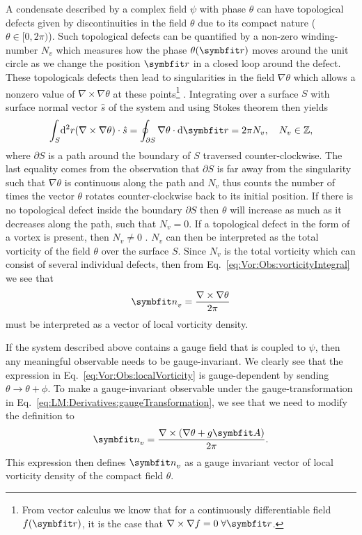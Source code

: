 A condensate described by a complex field $\psi$ with phase $\theta$ can have topological defects given by discontinuities in the field $\theta$ due to its compact
nature ($\theta\in[0,2\pi)$). Such topological defects can be quantified by a non-zero winding-number $N_v$ which measures how the phase $\theta(\v{r})$ moves around the
unit circle as we change the position $\v{r}$ in a closed loop around the defect. These topologicals
defects then lead to singularities in the field $\nabla\theta$ which allows a nonzero value of $\nabla\times\nabla\theta$ at these points\footnote{From vector calculus
we know that for a continuously differentiable field $f(\v{r})$, it is the case that $\nabla\times\nabla f = 0\;\forall\v{r}$.}%
. Integrating over a surface
$S$ with surface normal vector $\hat{s}$ of the system and using Stokes theorem then yields
\begin{equation}
    \label{eq:Vor:Obs:vorticityIntegral}
    \int_S\!\mathrm{d}^2r (\nabla\times\nabla\theta)\cdot\hat{s} = \oint_{\partial S}\nabla\theta\cdot\mathrm{d}\v{r} = 2\pi N_v,\quad N_v\in\mathbb{Z},
\end{equation}
where $\partial S$ is a path around the boundary of $S$ traversed counter-clockwise. The last equality comes from the observation that
$\partial S$ is far away from the singularity such that $\nabla\theta$ is continuous along the path and $N_v$ thus counts the number of times the vector $\theta$
rotates counter-clockwise back to its initial position. If there is no topological defect inside the boundary $\partial S$ then $\theta$ will increase as much as it
decreases along the path, such that $N_v=0$. If a topological defect in the form of a vortex is present, then $N_v\neq0$ \cite{Smorgrav052}.
$N_v$ can then be interpreted as the total vorticity of the field $\theta$ over the surface $S$.
Since $N_v$ is the total vorticity which can consist of several individual defects, then from Eq.~\eqref{eq:Vor:Obs:vorticityIntegral} we see that
\begin{equation}
    \label{eq:Vor:Obs:localVorticity}
    \v{n}_v = \frac{\nabla\times\nabla\theta}{2\pi} 
\end{equation}
must be interpreted as a vector of local vorticity density.

If the system described above contains a gauge field that is coupled to $\psi$, then any meaningful observable needs to be gauge-invariant.
We clearly see that the expression in Eq.~\eqref{eq:Vor:Obs:localVorticity} is gauge-dependent by sending $\theta\to\theta+\phi$. To make a gauge-invariant observable under
the gauge-transformation in Eq.~\eqref{eq:LM:Derivatives:gaugeTransformation}, we see that we need to modify the definition to
\begin{equation}
    \label{eq:Vor:Obs:localGaugeVorticity}
    \v{n}_v = \frac{\nabla\times(\nabla\theta + g\v{A})}{2\pi}.
\end{equation}
This expression then defines $\v{n}_v$ as a gauge invariant vector of local vorticity density of the compact field $\theta$.


